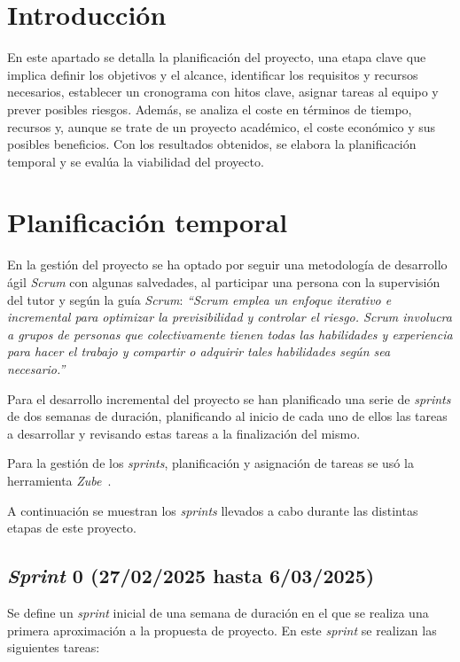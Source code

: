 
\section{Introducción}

En este apartado se detalla la planificación del proyecto, una etapa clave que implica definir los objetivos y el alcance, identificar los requisitos y recursos necesarios, establecer un cronograma con hitos clave, asignar tareas al equipo y prever posibles riesgos. Además, se analiza el coste en términos de tiempo, recursos y, aunque se trate de un proyecto académico, el coste económico y sus posibles beneficios. Con los resultados obtenidos, se elabora la planificación temporal y se evalúa la viabilidad del proyecto.

\section{Planificación temporal}

En la gestión del proyecto se ha optado por seguir una metodología de desarrollo ágil \textit{Scrum} con algunas salvedades, al participar una persona con la supervisión del tutor y según la guía \textit{Scrum}: \textit{``Scrum emplea un enfoque iterativo e incremental para optimizar la previsibilidad y controlar el riesgo.
\textit{Scrum} involucra a grupos de personas que colectivamente tienen todas las habilidades y experiencia
para hacer el trabajo y compartir o adquirir tales habilidades según sea necesario.''}~\cite{scrumguides:guia}

Para el desarrollo incremental del proyecto se han planificado una serie de \textit{sprints} de dos semanas de duración, planificando al inicio de cada uno de ellos las tareas a desarrollar y revisando estas tareas a la finalización del mismo.

Para la gestión de los \textit{sprints}, planificación y asignación de tareas se usó la herramienta \textit{Zube}~\cite{web:zube}.

A continuación se muestran los \textit{sprints} llevados a cabo durante las distintas etapas de este proyecto.

\subsection{\emph{Sprint} 0 (27/02/2025 hasta 6/03/2025)}
Se define un \textit{sprint} inicial de una semana de duración en el que se realiza una primera aproximación a la propuesta de proyecto. En este \textit{sprint} se realizan las siguientes tareas:

